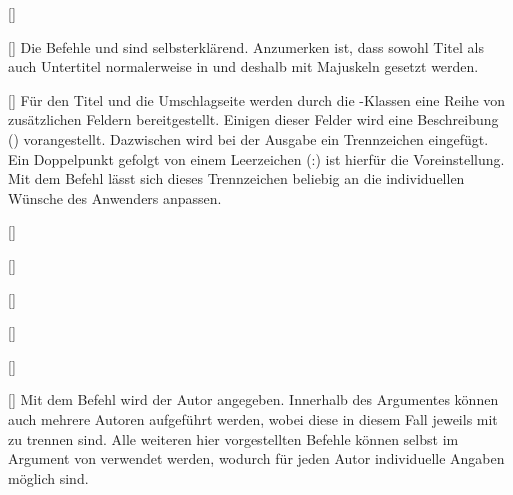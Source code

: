 \begin{Declaration*}{}
\begin{Declaration*}{}
\begin{Declaration*}{}
\begin{Declaration}{[]}
\begin{Declaration}{[]}
\printdeclarationlist%
%
%
Die Befehle  und  sind selbsterklärend. Anzumerken 
ist, dass sowohl Titel als auch Untertitel normalerweise in \DIN und deshalb 
mit Majuskeln gesetzt werden. 
\end{Declaration}
\end{Declaration}

\begin{Declaration}{[]}
\printdeclarationlist%
%
%
Für den Titel und die Umschlagseite werden durch die \TUDScript-Klassen eine 
Reihe von zusätzlichen Feldern bereitgestellt. Einigen dieser Felder wird eine 
Beschreibung () vorangestellt. Dazwischen 
wird bei der Ausgabe ein Trennzeichen eingefügt. Ein Doppelpunkt gefolgt von 
einem Leerzeichen (:) ist hierfür die Voreinstellung. Mit 
dem Befehl  lässt sich dieses Trennzeichen beliebig an 
die individuellen Wünsche des Anwenders anpassen.
\end{Declaration}

\begin{Declaration}{[]}
\begin{Declaration}{[]}
\begin{Declaration}{[]}
\begin{Declaration}{[]}
\begin{Declaration}{[]}
\begin{Declaration}{[]}
\printdeclarationlist%
%
%
%
Mit dem Befehl  wird der Autor angegeben. Innerhalb des 
Argumentes können auch mehrere Autoren aufgeführt werden, wobei diese in diesem 
Fall jeweils mit  zu trennen sind. Alle weiteren hier vorgestellten 
Befehle können selbst im Argument von  verwendet werden, wodurch 
für jeden Autor individuelle Angaben möglich sind.


\end{Declaration}
\end{Declaration}
\end{Declaration}
\end{Declaration}
\end{Declaration}
\end{Declaration}
\end{Declaration*}
\end{Declaration*}
\end{Declaration*}
